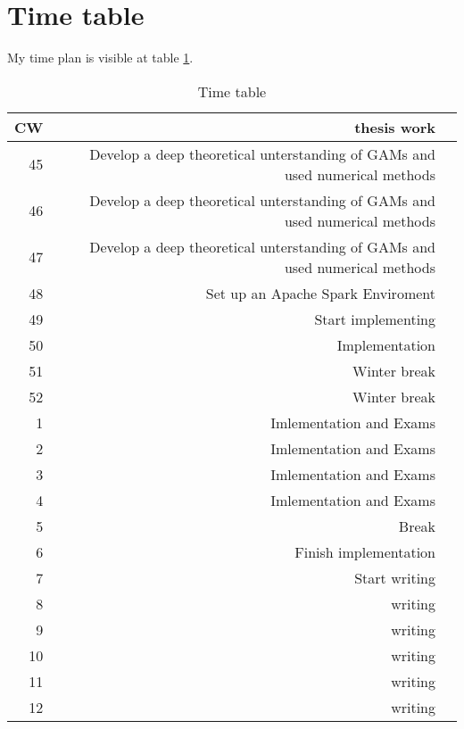 \documentclass{article}
\begin{document}
    \section{Time table}
    My time plan is visible at table \ref{timetable}.
    \begin{table}[h]
        \begin{center}
        \caption{Time table} %
        \label{timetable}
        \begin{tabular}{rrl}
            \toprule
            CW & thesis work \\
            \midrule
            45  & Develop a deep theoretical unterstanding of GAMs and used numerical methods \\
            46  & Develop a deep theoretical unterstanding of GAMs and used numerical methods \\
            47  & Develop a deep theoretical unterstanding of GAMs and used numerical methods \\
            48  & Set up an Apache Spark Enviroment \\
            49  & Start implementing  \\
            50  & Implementation \\
            51  & Winter break \\
            52  & Winter break \\
            1  & Imlementation and Exams \\
            2  & Imlementation and Exams \\
            3  & Imlementation and Exams \\
            4  & Imlementation and Exams \\
            5  & Break \\
            6  & Finish implementation \\
            7  & Start writing \\
            8  & writing \\
            9  & writing \\
            10  & writing \\
            11  & writing \\
            12  & writing \\


        \end{tabular}
        \end{center}
    \end{table}
    \newpage


    \newpage
\end{document}
